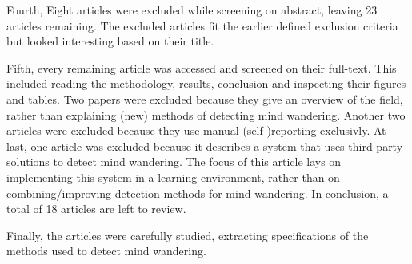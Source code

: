 Fourth, Eight articles were excluded while screening on abstract, leaving 23 articles remaining. 
The excluded articles fit the earlier defined exclusion criteria but looked interesting based on their title.

Fifth, every remaining article was accessed and screened on their full-text. This included reading the methodology, results, conclusion and inspecting their figures and tables.
Two papers were excluded because they give an overview of the field, rather than explaining (new) methods of detecting mind wandering. 
Another two articles were excluded because they use manual (self-)reporting exclusivly.
At last, one article was excluded because it describes a system that uses third party solutions to detect mind wandering. The focus of this article lays on implementing this system in a learning environment, rather than on combining/improving detection methods for mind wandering.
In conclusion, a total of 18 articles are left to review.

Finally, the articles were carefully studied, extracting specifications of the methods used to detect mind wandering.
